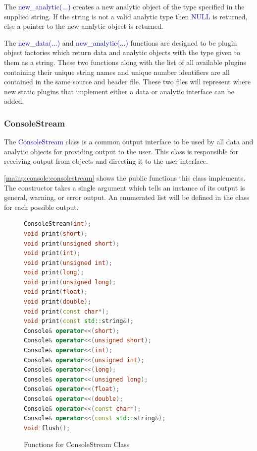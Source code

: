 \documentclass[10pt]{article}
\providecommand{\h}[1]{\textcolor{darkblue}{#1}}
\begin{document}
The \h{new\_analytic(...)} creates a new analytic object of the type specified 
in the supplied string. If the string is not a valid analytic type then 
\h{NULL} is returned, else a pointer to the new analytic object is returned.

The \h{new\_data(...)} and \h{new\_analytic(...)} functions are designed to be 
plugin object factories which return data and analytic objects with the type 
given to them as a string. These two functions along with the list of all 
available plugins containing their unique string names and unique number 
identifiers are all contained in the same source and header file. These two 
files will represent where new static plugins that implement either a data or 
analytic interface can be added.

\subsubsection{ConsoleStream}

The \h{ConsoleStream} class is a common output interface to be used by all data 
and analytic objects for providing output to the user. This class is 
responsible for receiving output from objects and directing it to the user 
interface.

\autoref{mainp:console:consolestream} shows the public functions this class 
implements. The constructor takes a single argument which tells an instance of 
its output is general, warning, or error output. An enumerated list will be 
defined in the class for each possible output.

\begin{figure}[H]
\begin{mdframed}[style=functions]
\begin{lstlisting}[language=C++]
ConsoleStream(int);
void print(short);
void print(unsigned short);
void print(int);
void print(unsigned int);
void print(long);
void print(unsigned long);
void print(float);
void print(double);
void print(const char*);
void print(const std::string&);
Console& operator<<(short);
Console& operator<<(unsigned short);
Console& operator<<(int);
Console& operator<<(unsigned int);
Console& operator<<(long);
Console& operator<<(unsigned long);
Console& operator<<(float);
Console& operator<<(double);
Console& operator<<(const char*);
Console& operator<<(const std::string&);
void flush();
\end{lstlisting}
\end{mdframed}
\caption{Functions for ConsoleStream Class}
\label{mainp:console:consolestream}
\end{figure}
\end{document}
